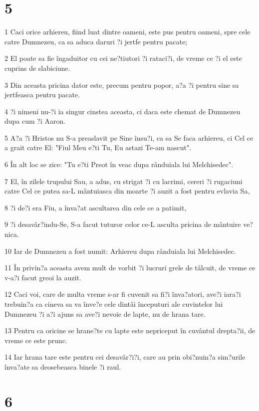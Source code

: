 \chapter{5}

\par 1 Caci orice arhiereu, fiind luat dintre oameni, este pus pentru oameni, spre cele catre Dumnezeu, ca sa aduca daruri ?i jertfe pentru pacate;
\par 2 El poate sa fie îngaduitor cu cei ne?tiutori ?i rataci?i, de vreme ce ?i el este cuprins de slabiciune.
\par 3 Din aceasta pricina dator este, precum pentru popor, a?a ?i pentru sine sa jertfeasca pentru pacate.
\par 4 ?i nimeni nu-?i ia singur cinstea aceasta, ci daca este chemat de Dumnezeu dupa cum ?i Aaron.
\par 5 A?a ?i Hristos nu S-a preaslavit pe Sine însu?i, ca sa Se faca arhiereu, ci Cel ce a grait catre El: "Fiul Meu e?ti Tu, Eu astazi Te-am nascut".
\par 6 În alt loc se zice: "Tu e?ti Preot în veac dupa rânduiala lui Melchisedec".
\par 7 El, în zilele trupului Sau, a adus, cu strigat ?i cu lacrimi, cereri ?i rugaciuni catre Cel ce putea sa-L mântuiasca din moarte ?i auzit a fost pentru evlavia Sa,
\par 8 ?i de?i era Fiu, a înva?at ascultarea din cele ce a patimit,
\par 9 ?i desavâr?indu-Se, S-a facut tuturor celor ce-L asculta pricina de mântuire ve?nica.
\par 10 Iar de Dumnezeu a fost numit: Arhiereu dupa rânduiala lui Melchisedec.
\par 11 În privin?a aceasta avem mult de vorbit ?i lucruri grele de tâlcuit, de vreme ce v-a?i facut greoi la auzit.
\par 12 Caci voi, care de multa vreme s-ar fi cuvenit sa fi?i înva?atori, ave?i iara?i trebuin?a ca cineva sa va înve?e cele dintâi începuturi ale cuvintelor lui Dumnezeu ?i a?i ajuns sa ave?i nevoie de lapte, nu de hrana tare.
\par 13 Pentru ca oricine se hrane?te cu lapte este nepriceput în cuvântul drepta?ii, de vreme ce este prunc.
\par 14 Iar hrana tare este pentru cei desavâr?i?i, care au prin obi?nuin?a sim?urile înva?ate sa deosebeasca binele ?i raul.

\chapter{6}

